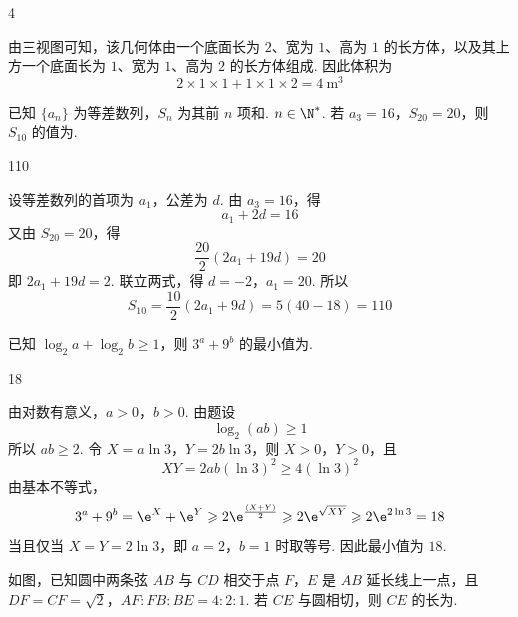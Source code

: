 \begin{answer}
4
\end{answer}

\begin{solution}
由三视图可知，该几何体由一个底面长为 \(2\)、宽为 \(1\)、高为 \(1\) 的长方体，以及其上方一个底面长为 \(1\)、宽为 \(1\)、高为 \(2\) 的长方体组成. 因此体积为
\[
2\times1\times1+1\times1\times2=4 \mathrm{~m}^{3}
\]
\end{solution}

\begin{problem}
已知 \( \{a_{n}\} \) 为等差数列，\( S_{n} \) 为其前 \(n\) 项和. \( n \in \N^{*} \). 若 \( a_{3} = 16 \)，\( S_{20} = 20 \)，则 \(S_{10}\) 的值为\fillinblank{}.
\end{problem}

\begin{answer}
110
\end{answer}

\begin{solution}
设等差数列的首项为 \(a_1\)，公差为 \(d\). 由 \(a_3=16\)，得
\[
a_1+2d=16
\]
又由 \(S_{20}=20\)，得
\[
\frac{20}{2}(2a_1+19d)=20
\]
即 \(2a_1+19d=2\). 联立两式，得 \(d=-2\)，\(a_1=20\). 所以
\[
S_{10}=\frac{10}{2}\left(2a_1+9d\right)
=5(40-18)=110
\]
\end{solution}

\begin{problem}
已知 \(\log_2 a + \log_2 b \geqslant 1\)，则 \(3^a + 9^b\) 的最小值为\fillinblank{}.
\end{problem}

\begin{answer}
18
\end{answer}

\begin{solution}
由对数有意义，\(a>0\)，\(b>0\). 由题设
\[
\log_2(ab)\geqslant1
\]
所以 \(ab\geqslant2\). 令 \(X=a\ln3\)，\(Y=2b\ln3\)，则 \(X>0\)，\(Y>0\)，且
\[
XY=2ab(\ln3)^2\geqslant4(\ln3)^2
\]
由基本不等式，
\[
3^a+9^b=\e^X+\e^Y
\geqslant2\e^{\frac{(X+Y)}{2}}
\geqslant2\e^{\sqrt{XY}}
\geqslant2\e^{2\ln3}=18
\]
当且仅当 \(X=Y=2\ln3\)，即 \(a=2\)，\(b=1\) 时取等号. 因此最小值为 \(18\).
\end{solution}

\begin{problem}
如图，已知圆中两条弦 \(AB\) 与 \(CD\) 相交于点 \(F\)，\(E\) 是 \(AB\) 延长线上一点，且 \(DF = CF = \sqrt{2}\)，\(AF:FB:BE = 4:2:1\). 若 \(CE\) 与圆相切，则 \(CE\) 的长为\fillinblank{}.

\end{problem}

